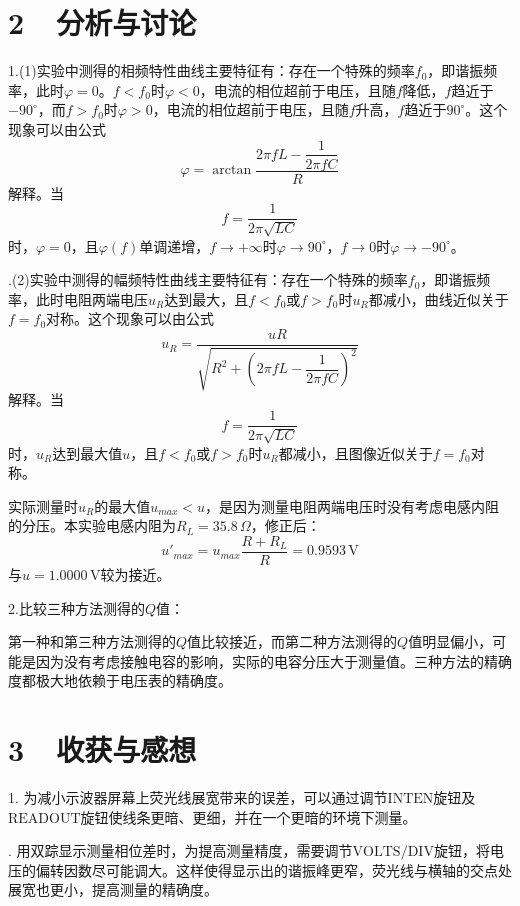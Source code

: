 \documentclass[a4paper,fontset=windows]{ctexart}
\begin{document}
    \newpage
    \section*{ 2\ \ 分析与讨论}

    1.(1)实验中测得的相频特性曲线主要特征有：存在一个特殊的频率$f_0$，即谐振频率，此时$\varphi = 0$。$f < f_0$时$\varphi < 0$，电流的相位超前于电压，且随$f$降低，$f$趋近于$-90^\circ$，而$f > f_0$时$\varphi > 0$，电流的相位超前于电压，且随$f$升高，$f$趋近于$90^\circ$。这个现象可以由公式
    \[
    \varphi = \arctan\dfrac{2\pi fL - \dfrac{1}{2\pi fC}}{R}
    \]
    解释。当
    \[
    f = \frac{1}{2\pi\sqrt{LC}}
    \]
    时，$\varphi = 0$，且$\varphi(f)$单调递增，$f \to +\infty$时$\varphi \to 90^\circ$，$f \to 0$时$\varphi \to -90^\circ$。

    .(2)实验中测得的幅频特性曲线主要特征有：存在一个特殊的频率$f_0$，即谐振频率，此时电阻两端电压$u_R$达到最大，且$f < f_0$或$f > f_0$时$u_R$都减小，曲线近似关于$f = f_0$对称。这个现象可以由公式
    \[
    u_R = \dfrac{uR}{\sqrt{R^2 + \left(2\pi fL - \dfrac{1}{2\pi fC}\right)^2}}
    \]
    解释。当
    \[
    f = \frac{1}{2\pi\sqrt{LC}}
    \]
    时，$u_R$达到最大值$u$，且$f < f_0$或$f > f_0$时$u_R$都减小，且图像近似关于$f = f_0$对称。

    实际测量时$u_R$的最大值$u_{max} < u$，是因为测量电阻两端电压时没有考虑电感内阻的分压。本实验电感内阻为$R_L = 35.8\,\Omega$，修正后：
    \[
    u'_{max} = u_{max}\frac{R + R_L}{R} = 0.9593\,\mathrm{V}
    \]
    与$u = 1.0000\,\mathrm{V}$较为接近。

    \bigskip
    2.比较三种方法测得的$Q$值：

    第一种和第三种方法测得的$Q$值比较接近，而第二种方法测得的$Q$值明显偏小，可能是因为没有考虑接触电容的影响，实际的电容分压大于测量值。三种方法的精确度都极大地依赖于电压表的精确度。

    \section*{ 3\ \ 收获与感想}

    1. 为减小示波器屏幕上荧光线展宽带来的误差，可以通过调节$\boxed{\mathrm{INTEN}}$旋钮及$\boxed{\mathrm{READOUT}}$旋钮使线条更暗、更细，并在一个更暗的环境下测量。

    . 用双踪显示测量相位差时，为提高测量精度，需要调节$\boxed{\mathrm{VOLTS/DIV}}$旋钮，将电压的偏转因数尽可能调大。这样使得显示出的谐振峰更窄，荧光线与横轴的交点处展宽也更小，提高测量的精确度。
\end{document}

